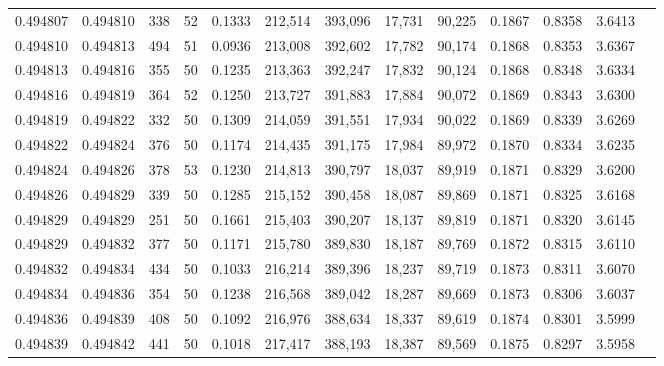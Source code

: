 \begin{tabular}{rrrrrrrrrrrrr}
0.494807 & 0.494810 &   338 &  52 &                                     0.1333 & 212,514 & 393,096 &  17,731 &  90,225 & 0.1867 & 0.8358 & 3.6413 \\
0.494810 & 0.494813 &   494 &  51 &                                     0.0936 & 213,008 & 392,602 &  17,782 &  90,174 & 0.1868 & 0.8353 & 3.6367 \\
0.494813 & 0.494816 &   355 &  50 &                                     0.1235 & 213,363 & 392,247 &  17,832 &  90,124 & 0.1868 & 0.8348 & 3.6334 \\
0.494816 & 0.494819 &   364 &  52 &                                     0.1250 & 213,727 & 391,883 &  17,884 &  90,072 & 0.1869 & 0.8343 & 3.6300 \\
0.494819 & 0.494822 &   332 &  50 &                                     0.1309 & 214,059 & 391,551 &  17,934 &  90,022 & 0.1869 & 0.8339 & 3.6269 \\
0.494822 & 0.494824 &   376 &  50 &                                     0.1174 & 214,435 & 391,175 &  17,984 &  89,972 & 0.1870 & 0.8334 & 3.6235 \\
0.494824 & 0.494826 &   378 &  53 &                                     0.1230 & 214,813 & 390,797 &  18,037 &  89,919 & 0.1871 & 0.8329 & 3.6200 \\
0.494826 & 0.494829 &   339 &  50 &                                     0.1285 & 215,152 & 390,458 &  18,087 &  89,869 & 0.1871 & 0.8325 & 3.6168 \\
0.494829 & 0.494829 &   251 &  50 &                                     0.1661 & 215,403 & 390,207 &  18,137 &  89,819 & 0.1871 & 0.8320 & 3.6145 \\
0.494829 & 0.494832 &   377 &  50 &                                     0.1171 & 215,780 & 389,830 &  18,187 &  89,769 & 0.1872 & 0.8315 & 3.6110 \\
0.494832 & 0.494834 &   434 &  50 &                                     0.1033 & 216,214 & 389,396 &  18,237 &  89,719 & 0.1873 & 0.8311 & 3.6070 \\
0.494834 & 0.494836 &   354 &  50 &                                     0.1238 & 216,568 & 389,042 &  18,287 &  89,669 & 0.1873 & 0.8306 & 3.6037 \\
0.494836 & 0.494839 &   408 &  50 &                                     0.1092 & 216,976 & 388,634 &  18,337 &  89,619 & 0.1874 & 0.8301 & 3.5999 \\
0.494839 & 0.494842 &   441 &  50 &                                     0.1018 & 217,417 & 388,193 &  18,387 &  89,569 & 0.1875 & 0.8297 & 3.5958 \\

\end{tabular}
